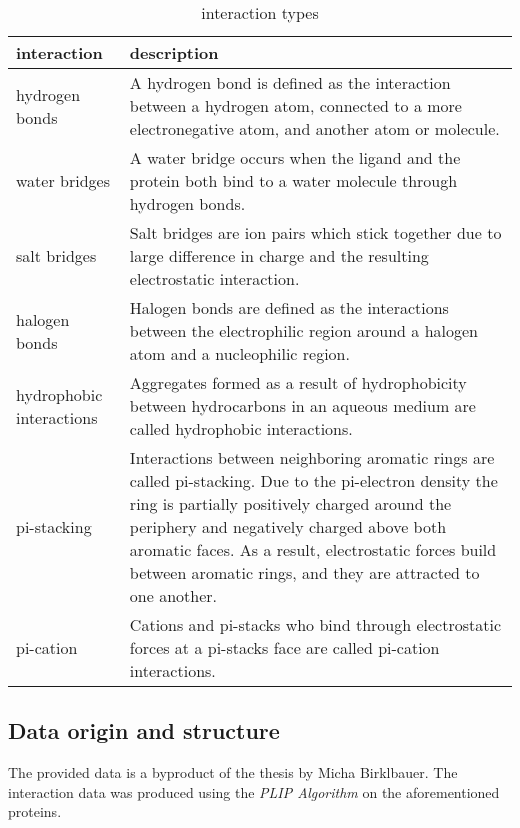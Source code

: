 \begin{table}[H]
    \centering
\begin{tabular}{ | m{10em} | m{30em}| } 
    \hline
    \textbf{interaction} &\textbf{description\cite[]{Birklbauer2021}}
    \\
    \hline
    hydrogen bonds& A hydrogen bond is defined as the interaction between a 
    hydrogen atom, connected to a more electronegative atom, and another atom or molecule. \\
    \hline
    water bridges   &A water bridge occurs when the ligand and the protein
    both bind to a water molecule through hydrogen bonds.\\
    \hline
    salt bridges&  Salt bridges are ion pairs which stick together due to
    large difference in charge and the resulting electrostatic interaction. \\
    \hline
    halogen bonds&  Halogen bonds are defined as the interactions between the electrophilic region
    around a halogen atom and a nucleophilic region.\\
    \hline
    hydrophobic interactions& Aggregates formed as a result
    of hydrophobicity between hydrocarbons in an 
    aqueous medium are called hydrophobic interactions.\\
    \hline
    pi-stacking   & Interactions between neighboring aromatic 
    rings are called pi-stacking. Due to the pi-electron density the ring is partially positively charged around 
    the periphery and negatively charged above both aromatic faces. As a result, electrostatic forces build between aromatic rings,
     and they are attracted to one another.\\
    \hline
    pi-cation& Cations and pi-stacks who bind through electrostatic 
    forces at a pi-stacks face are called pi-cation interactions.\\
    \hline
   \end{tabular}
   \caption{interaction types}
\end{table}
    


\subsection{Data origin and structure} 
The provided data is a byproduct of the thesis \cite[]{Birklbauer2021} by Micha Birklbauer.
The interaction data was produced using the \textit{PLIP Algorithm} \cite[]{Salentin2015} 
on the aforementioned proteins.

